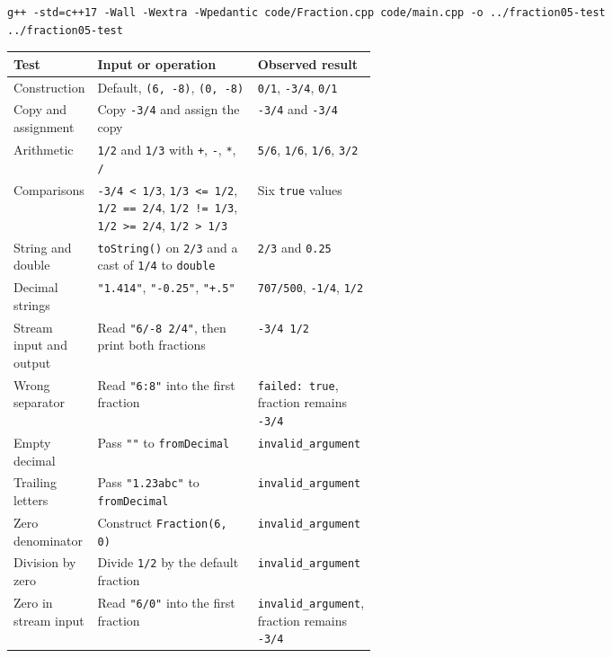 \documentclass[10pt,a4paper]{article}
\newcommand{\code}[1]{\texttt{#1}}
\begin{document}
{\small
\begin{verbatim}
g++ -std=c++17 -Wall -Wextra -Wpedantic code/Fraction.cpp code/main.cpp -o ../fraction05-test
../fraction05-test
\end{verbatim}
}

{\small
\setlength{\tabcolsep}{5pt}
\renewcommand{\arraystretch}{1.06}
\noindent\begin{tabularx}{\linewidth}{@{}>{\raggedright\arraybackslash}p{0.188\linewidth}
    >{\raggedright\arraybackslash}X >{\raggedright\arraybackslash}p{0.285\linewidth}@{}}
\toprule
\textbf{Test} & \textbf{Input or operation} & \textbf{Observed result} \\
\midrule
Construction & Default, \code{(6, -8)}, \code{(0, -8)} & \code{0/1}, \code{-3/4}, \code{0/1} \\
Copy and assignment & Copy \code{-3/4} and assign the copy & \code{-3/4} and \code{-3/4} \\
Arithmetic & \code{1/2} and \code{1/3} with \code{+}, \code{-}, \code{*}, \code{/} & \code{5/6}, \code{1/6}, \code{1/6}, \code{3/2} \\
Comparisons & \code{-3/4 < 1/3}, \code{1/3 <= 1/2}, \code{1/2 == 2/4}, \code{1/2 != 1/3}, \code{1/2 >= 2/4}, \code{1/2 > 1/3} & Six \code{true} values \\
String and double & \code{toString()} on \code{2/3} and a cast of \code{1/4} to \code{double} & \code{2/3} and \code{0.25} \\
Decimal strings & \code{"1.414"}, \code{"-0.25"}, \code{"+.5"} & \code{707/500}, \code{-1/4}, \code{1/2} \\
Stream input and output & Read \code{"6/-8 2/4"}, then print both fractions & \code{-3/4 1/2} \\
Wrong separator & Read \code{"6:8"} into the first fraction & \code{failed: true}, fraction remains \code{-3/4} \\
Empty decimal & Pass \code{""} to \code{fromDecimal} & \code{invalid\_argument} \\
Trailing letters & Pass \code{"1.23abc"} to \code{fromDecimal} & \code{invalid\_argument} \\
Zero denominator & Construct \code{Fraction(6, 0)} & \code{invalid\_argument} \\
Division by zero & Divide \code{1/2} by the default fraction & \code{invalid\_argument} \\
Zero in stream input & Read \code{"6/0"} into the first fraction & \code{invalid\_argument}, fraction remains \code{-3/4} \\
\bottomrule
\end{tabularx}\par
}
\end{document}
